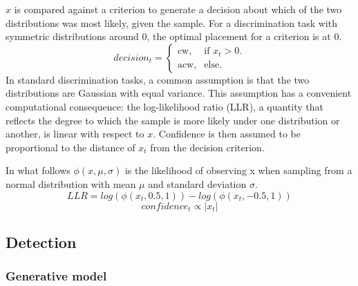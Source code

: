 \documentclass[12pt,twoside]{reedthesis}
\begin{document}
\(x\) is compared against a criterion to generate a decision about which of the two distributions was most likely, given the sample. For a discrimination task with symmetric distributions around 0, the optimal placement for a criterion is at 0.
\begin{equation}
  decision_t=\begin{cases}
    \text{cw}, & \text{if } x_t>0.\\
   \text{acw}, & \text{else}.
    
  \end{cases}
\end{equation}
In standard discrimination tasks, a common assumption is that the two distributions are Gaussian with equal variance. This assumption has a convenient computational consequence: the log-likelihood ratio (LLR), a quantity that reflects the degree to which the sample is more likely under one distribution or another, is linear with respect to \(x\). Confidence is then assumed to be proportional to the distance of \(x_t\) from the decision criterion.

In what follows \(\phi(x,\mu,\sigma)\) is the likelihood of observing x when sampling from a normal distribution with mean \(\mu\) and standard deviation \(\sigma\).
\begin{equation}
LLR = log(\phi(x_t,0.5,1))-log(\phi(x_t,-0.5,1))
\end{equation}
\begin{equation}
confidence_t \propto |x_t|
\end{equation}
\hypertarget{detection-3}{%
\subsection{Detection}\label{detection-3}}

\hypertarget{generative-model-3}{%
\subsubsection*{Generative model}\label{generative-model-3}}
\end{document}
